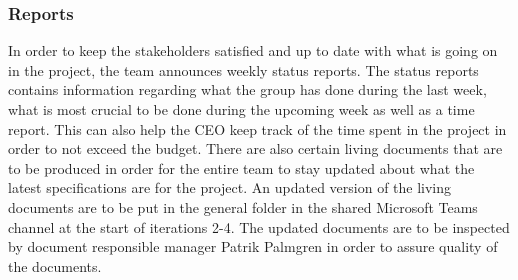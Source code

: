 \subsubsection{Reports}
In order to keep the stakeholders satisfied and up to date with what is going on in the project, the team announces weekly status reports. The status reports contains information regarding what the group has done during the last week, what is most crucial to be done during the upcoming week as well as a time report. This can also help the CEO keep track of the time spent in the project in order to not exceed the budget. There are also certain living documents that are to be produced in order for the entire team to stay updated about what the latest specifications are for the project. An updated version of the living documents are to be put in the general folder in the shared Microsoft Teams channel at the start of iterations 2-4. The updated documents are to be inspected by document responsible manager Patrik Palmgren in order to assure quality of the documents. 
